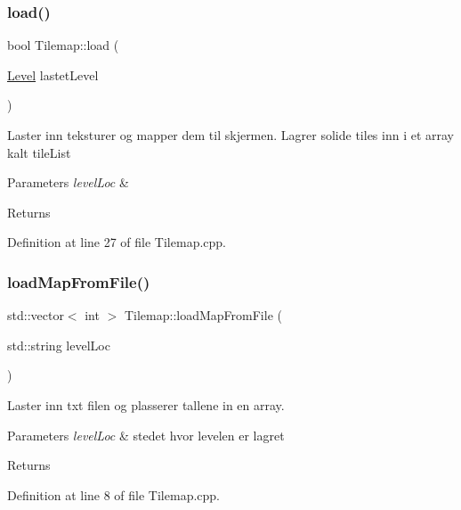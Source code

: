 \subsubsection{\texorpdfstring{load()}{load()}}
{\footnotesize\ttfamily bool Tilemap\+::load (\begin{DoxyParamCaption}\item[{\hyperlink{class_level}{Level}}]{lastet\+Level }\end{DoxyParamCaption})}

Laster inn teksturer og mapper dem til skjermen. Lagrer solide tiles inn i et array kalt tile\+List 
\begin{DoxyParams}{Parameters}
{\em level\+Loc} & \\
\hline
\end{DoxyParams}
\begin{DoxyReturn}{Returns}

\end{DoxyReturn}


Definition at line 27 of file Tilemap.\+cpp.

\hypertarget{class_tilemap_aaf6018db69a5590cd7346bd4de98fc35}{}\label{class_tilemap_aaf6018db69a5590cd7346bd4de98fc35} 
\subsubsection{\texorpdfstring{load\+Map\+From\+File()}{loadMapFromFile()}}
{\footnotesize\ttfamily std\+::vector$<$ int $>$ Tilemap\+::load\+Map\+From\+File (\begin{DoxyParamCaption}\item[{std\+::string}]{level\+Loc }\end{DoxyParamCaption})}

Laster inn txt filen og plasserer tallene in en array. 
\begin{DoxyParams}{Parameters}
{\em level\+Loc} & stedet hvor levelen er lagret \\
\hline
\end{DoxyParams}
\begin{DoxyReturn}{Returns}

\end{DoxyReturn}


Definition at line 8 of file Tilemap.\+cpp.

\hypertarget{class_tilemap_aa987cd1aa8ebf71dbe2333dafe2b4039}{}\label{class_tilemap_aa987cd1aa8ebf71dbe2333dafe2b4039} 

